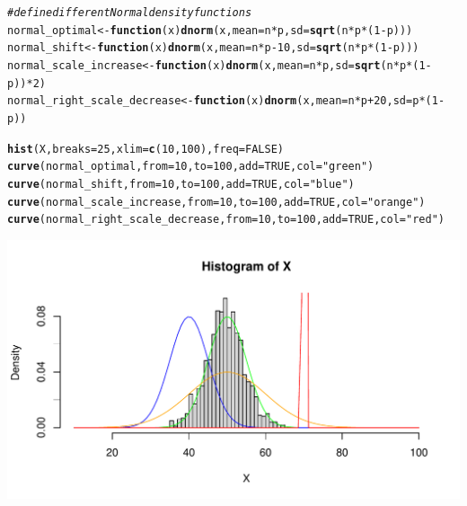 \documentclass[a4paper]{article}
\makeatletter
\def\maxwidth{ %
  \ifdim\Gin@nat@width>\linewidth
    \linewidth
  \else
    \Gin@nat@width
  \fi
}
\newcommand{\hlnum}[1]{\textcolor[rgb]{0.686,0.059,0.569}{#1}}%
\newcommand{\hlstr}[1]{\textcolor[rgb]{0.192,0.494,0.8}{#1}}%
\newcommand{\hlcom}[1]{\textcolor[rgb]{0.678,0.584,0.686}{\textit{#1}}}%
\newcommand{\hlopt}[1]{\textcolor[rgb]{0,0,0}{#1}}%
\newcommand{\hlstd}[1]{\textcolor[rgb]{0.345,0.345,0.345}{#1}}%
\newcommand{\hlkwa}[1]{\textcolor[rgb]{0.161,0.373,0.58}{\textbf{#1}}}%
\newcommand{\hlkwb}[1]{\textcolor[rgb]{0.69,0.353,0.396}{#1}}%
\newcommand{\hlkwc}[1]{\textcolor[rgb]{0.333,0.667,0.333}{#1}}%
\newcommand{\hlkwd}[1]{\textcolor[rgb]{0.737,0.353,0.396}{\textbf{#1}}}%
\newenvironment{kframe}{%
 \def\at@end@of@kframe{}%
 \ifinner\ifhmode%
  \def\at@end@of@kframe{\end{minipage}}%
  \begin{minipage}{\columnwidth}%
 \fi\fi%
 \def\FrameCommand##1{\hskip\@totalleftmargin \hskip-\fboxsep
 \colorbox{shadecolor}{##1}\hskip-\fboxsep
     \hskip-\linewidth \hskip-\@totalleftmargin \hskip\columnwidth}%
 \MakeFramed {\advance\hsize-\width
   \@totalleftmargin\z@ \linewidth\hsize
   \@setminipage}}%
 {\par\unskip\endMakeFramed%
 \at@end@of@kframe}
\newenvironment{knitrout}{}{} %
\makeatother
\begin{document}
{\begin{enumerate}
\begin{knitrout}
\begin{kframe}
\begin{alltt}
\hlcom{# define different Normal density functions}
\hlstd{normal_optimal} \hlkwb{<-} \hlkwa{function}\hlstd{(}\hlkwc{x}\hlstd{)} \hlkwd{dnorm}\hlstd{(x,} \hlkwc{mean} \hlstd{= n}\hlopt{*}\hlstd{p,} \hlkwc{sd} \hlstd{=} \hlkwd{sqrt}\hlstd{(n}\hlopt{*}\hlstd{p}\hlopt{*}\hlstd{(}\hlnum{1}\hlopt{-}\hlstd{p)))}
\hlstd{normal_shift} \hlkwb{<-} \hlkwa{function}\hlstd{(}\hlkwc{x}\hlstd{)} \hlkwd{dnorm}\hlstd{(x,} \hlkwc{mean} \hlstd{= n}\hlopt{*}\hlstd{p} \hlopt{-} \hlnum{10}\hlstd{,} \hlkwc{sd} \hlstd{=} \hlkwd{sqrt}\hlstd{(n}\hlopt{*}\hlstd{p}\hlopt{*}\hlstd{(}\hlnum{1}\hlopt{-}\hlstd{p)))}
\hlstd{normal_scale_increase} \hlkwb{<-} \hlkwa{function}\hlstd{(}\hlkwc{x}\hlstd{)} \hlkwd{dnorm}\hlstd{(x,} \hlkwc{mean} \hlstd{= n}\hlopt{*}\hlstd{p,} \hlkwc{sd} \hlstd{=} \hlkwd{sqrt}\hlstd{(n}\hlopt{*}\hlstd{p}\hlopt{*}\hlstd{(}\hlnum{1}\hlopt{-}\hlstd{p))}\hlopt{*}\hlnum{2}\hlstd{)}
\hlstd{normal_right_scale_decrease} \hlkwb{<-} \hlkwa{function}\hlstd{(}\hlkwc{x}\hlstd{)} \hlkwd{dnorm}\hlstd{(x,} \hlkwc{mean} \hlstd{= n}\hlopt{*}\hlstd{p} \hlopt{+} \hlnum{20}\hlstd{,} \hlkwc{sd} \hlstd{= p}\hlopt{*}\hlstd{(}\hlnum{1}\hlopt{-}\hlstd{p))}

\hlkwd{hist}\hlstd{(X,} \hlkwc{breaks} \hlstd{=} \hlnum{25}\hlstd{,} \hlkwc{xlim} \hlstd{=} \hlkwd{c}\hlstd{(}\hlnum{10}\hlstd{,} \hlnum{100}\hlstd{),} \hlkwc{freq} \hlstd{=} \hlnum{FALSE}\hlstd{)}
\hlkwd{curve}\hlstd{(normal_optimal,} \hlkwc{from} \hlstd{=} \hlnum{10}\hlstd{,} \hlkwc{to} \hlstd{=} \hlnum{100}\hlstd{,} \hlkwc{add} \hlstd{=} \hlnum{TRUE}\hlstd{,} \hlkwc{col} \hlstd{=} \hlstr{"green"}\hlstd{)}
\hlkwd{curve}\hlstd{(normal_shift,} \hlkwc{from} \hlstd{=} \hlnum{10}\hlstd{,} \hlkwc{to} \hlstd{=} \hlnum{100}\hlstd{,} \hlkwc{add} \hlstd{=} \hlnum{TRUE}\hlstd{,} \hlkwc{col} \hlstd{=} \hlstr{"blue"}\hlstd{)}
\hlkwd{curve}\hlstd{(normal_scale_increase,} \hlkwc{from} \hlstd{=} \hlnum{10}\hlstd{,} \hlkwc{to} \hlstd{=} \hlnum{100}\hlstd{,} \hlkwc{add} \hlstd{=} \hlnum{TRUE}\hlstd{,} \hlkwc{col} \hlstd{=} \hlstr{"orange"}\hlstd{)}
\hlkwd{curve}\hlstd{(normal_right_scale_decrease,} \hlkwc{from} \hlstd{=} \hlnum{10}\hlstd{,} \hlkwc{to} \hlstd{=} \hlnum{100}\hlstd{,} \hlkwc{add} \hlstd{=} \hlnum{TRUE}\hlstd{,} \hlkwc{col} \hlstd{=} \hlstr{"red"}\hlstd{)}
\end{alltt}
\end{kframe}
\includegraphics[width=\maxwidth]{figure/unnamed-chunk-2-1} 
\end{knitrout}


\end{enumerate}}
\end{document}
